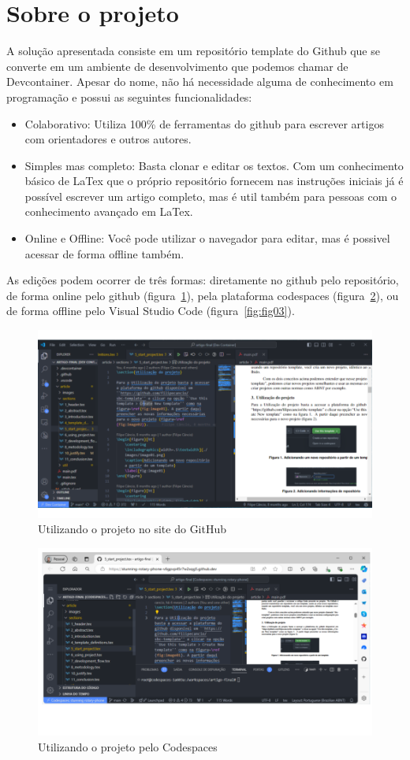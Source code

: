\section{Sobre o projeto}

A solução apresentada consiste em um repositório template do Github  que se converte em um ambiente de desenvolvimento que podemos chamar de Devcontainer. Apesar do nome, não  há necessidade alguma de conhecimento em programação e possui as seguintes funcionalidades:

\begin{itemize}
	\item Colaborativo: Utiliza 100\% de ferramentas do github para escrever artigos com orientadores e outros autores.
	\item Simples mas completo: Basta clonar e editar os textos. Com um conhecimento básico de LaTex que o próprio repositório fornecem nas instruções iniciais já é possível escrever um artigo completo, mas é util também para pessoas com o conhecimento avançado em LaTex.
	\item Online e Offline: Você pode utilizar o navegador para editar, mas é possivel acessar de forma offline também.
\end{itemize}


As edições podem ocorrer de três formas: diretamente no github pelo repositório, de forma online pelo github (figura~\ref{fig:fig01}), pela plataforma codespaces (figura~\ref{fig:fig02}), ou de forma offline pelo Visual Studio Code (figura~\ref{fig:fig03}).


\begin{figure}[ht]
	\centering
	\includegraphics[width=.6\textwidth]{./images/fig01.png}
	\caption{Utilizando o projeto no site do GitHub}
	\label{fig:fig01}
\end{figure}

\begin{figure}[ht]
	\centering
	\includegraphics[width=.6\textwidth]{./images/fig02.png}
	\caption{Utilizando o projeto pelo Codespaces}
	\label{fig:fig02}
\end{figure}

